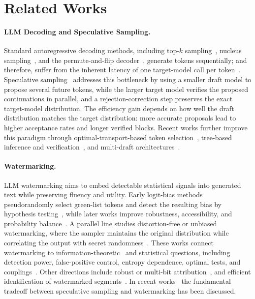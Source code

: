 \documentclass{article}
\theoremstyle{plain}
\theoremstyle{definition}
\begin{document}
\section{Related Works}
\label{sec::related}


\paragraph{LLM Decoding and Speculative Sampling.}

Standard autoregressive decoding methods, including top-$k$ sampling~\citep{radford2019language, fan2018hierarchical}, nucleus sampling~\citep{holtzman2020curious}, and the permute-and-flip decoder~\citep{zhao2024permute}, generate tokens sequentially; and therefore, suffer from the inherent latency of one target-model call per token~\citep{stern2018blockwise}. 
Speculative sampling~\citep{chen2023accelerating, leviathan2023fast} addresses this bottleneck by using a smaller draft model to propose several future tokens, while the larger target model verifies the proposed continuations in parallel, and a rejection-correction step preserves the exact target-model distribution. 
The efficiency gain depends on how well the draft distribution matches the target distribution: more accurate proposals lead to higher acceptance rates and longer verified blocks. 
Recent works further improve this paradigm through optimal-transport-based token selection~\citep{sun2023spectr}, tree-based inference and verification~\citep{miao2024specinfer}, and multi-draft architectures~\citep{khisti2024multi, rowan2025list}. 



\paragraph{Watermarking.}


LLM watermarking aims to embed detectable statistical signals into generated text while preserving fluency and utility. 
Early logit-bias methods pseudorandomly select green-list tokens and detect the resulting bias by hypothesis testing~\citep{kirchenbauer2023watermark}, while later works improve robustness, accessibility, and probability balance~\citep{wu2023resilient, giboulot2024watermax, park2026watermod}. 
A parallel line studies distortion-free or unbiased watermarking, where the sampler maintains the original distribution while correlating the output with secret randomness~\citep{kuditipudi2023robust, hu2023unbiased, christ2024undetectable}. 
These works connect watermarking to information-theoretic~\citep{moulin2003information} and statistical questions, including detection power, false-positive control, entropy dependence, optimal tests, and couplings~\citep{li2025statistical, he2025empirical, tsur2025optimized, tsur2025heavywater}. 
Other directions include robust or multi-bit attribution~\citep{zhao2023provable, boroujeny2024multi, qu2025provably}, and efficient identification of watermarked segments~\citep{zhao2025efficiently}. 
In recent works~\citep{hu2024inevitable, he2026improving} the fundamental tradeoff between speculative sampling and watermarking has been discussed. 
\end{document}
